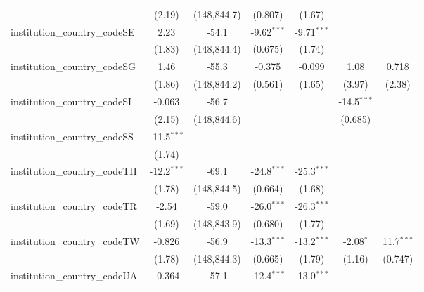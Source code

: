 \begin{tabular}{lcccccc}
                                         & (2.19)        & (148,844.7)   & (0.807)       & (1.67)        &               &   \\   
   institution\_country\_codeSE          & 2.23          & -54.1         & -9.62$^{***}$ & -9.71$^{***}$ &               &   \\   
                                         & (1.83)        & (148,844.4)   & (0.675)       & (1.74)        &               &   \\   
   institution\_country\_codeSG          & 1.46          & -55.3         & -0.375        & -0.099        & 1.08          & 0.718\\   
                                         & (1.86)        & (148,844.2)   & (0.561)       & (1.65)        & (3.97)        & (2.38)\\   
   institution\_country\_codeSI          & -0.063        & -56.7         &               &               & -14.5$^{***}$ &   \\   
                                         & (2.15)        & (148,844.6)   &               &               & (0.685)       &   \\   
   institution\_country\_codeSS          & -11.5$^{***}$ &               &               &               &               &   \\   
                                         & (1.74)        &               &               &               &               &   \\   
   institution\_country\_codeTH          & -12.2$^{***}$ & -69.1         & -24.8$^{***}$ & -25.3$^{***}$ &               &   \\   
                                         & (1.78)        & (148,844.5)   & (0.664)       & (1.68)        &               &   \\   
   institution\_country\_codeTR          & -2.54         & -59.0         & -26.0$^{***}$ & -26.3$^{***}$ &               &   \\   
                                         & (1.69)        & (148,843.9)   & (0.680)       & (1.77)        &               &   \\   
   institution\_country\_codeTW          & -0.826        & -56.9         & -13.3$^{***}$ & -13.2$^{***}$ & -2.08$^{*}$   & 11.7$^{***}$\\   
                                         & (1.78)        & (148,844.3)   & (0.665)       & (1.79)        & (1.16)        & (0.747)\\   
   institution\_country\_codeUA          & -0.364        & -57.1         & -12.4$^{***}$ & -13.0$^{***}$ &               &   \\   

\end{tabular}
